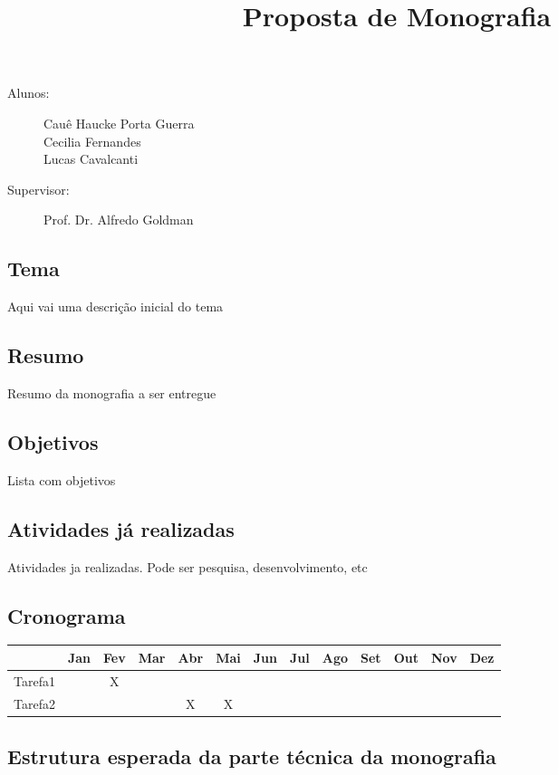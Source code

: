 \documentclass[titlepage]{article}
\title{Proposta de Monografia}
\author{}
\begin{document}
\maketitle

\begin{description} 
\item[Alunos:]Cauê Haucke Porta Guerra\\Cecilia Fernandes\\Lucas Cavalcanti
\item[Supervisor: ] Prof. Dr. Alfredo Goldman
\end{description}

\subsection{Tema}
Aqui vai uma descrição inicial do tema

\subsection{Resumo}
Resumo da monografia a ser entregue

\subsection{Objetivos}
Lista com objetivos

\subsection{Atividades já realizadas}
Atividades ja realizadas. Pode ser pesquisa, desenvolvimento, etc

\subsection{Cronograma}
\begin{tabular}{|l|c|c|c|c|c|c|c|c|c|c|c|c|}
  \hline
  & Jan & Fev & Mar & Abr & Mai & Jun & Jul & Ago & Set & Out & Nov & Dez \\ \hline
	Tarefa1 & & X & & & & & & & & & & \\ \hline
  Tarefa2 & & & & X & X & & & & & & &\\
  \hline
\end{tabular}

\subsection{Estrutura esperada da parte técnica da monografia}
\end{document}
